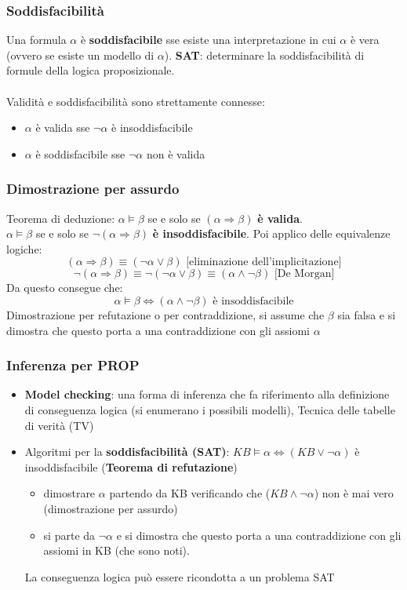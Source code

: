 \subsubsection{Soddisfacibilità}
Una formula $\alpha$ è \textbf{soddisfacibile} sse esiste una interpretazione in cui $\alpha$ è vera (ovvero se esiste un modello di $\alpha$).
\textbf{SAT}: determinare la soddisfacibilità di formule della logica proposizionale.\\\\
Validità e soddisfacibilità sono strettamente connesse:
\begin{itemize}
    \item $\alpha$ è valida sse $\lnot\alpha$ è insoddisfacibile
    \item $\alpha$ è soddisfacibile sse $\lnot\alpha$ non è valida
\end{itemize}

\subsubsection{Dimostrazione per assurdo}
Teorema di deduzione: $\alpha \models \beta$ se e solo se $(\alpha \Rightarrow \beta)$ \textbf{è valida}.\\
$\alpha \models \beta$ se e solo se $\lnot(\alpha \Rightarrow \beta)$ \textbf{è insoddisfacibile}.
Poi applico delle equivalenze logiche:
$$(\alpha \Rightarrow \beta) \equiv (\lnot\alpha \lor \beta) \text{ [eliminazione dell'implicitazione]}$$
$$\lnot(\alpha \Rightarrow \beta) \equiv \lnot (\lnot \alpha \lor \beta) \equiv (\alpha \land \lnot \beta) \text{ [De Morgan]}$$
Da questo consegue che:
$$\alpha \models \beta \Leftrightarrow (\alpha \land \lnot \beta) \text{ è insoddisfacibile}$$
Dimostrazione per refutazione o per contraddizione, si assume che $\beta$ sia falsa e si dimostra che questo porta a una contraddizione
con gli assiomi $\alpha$

\subsubsection{Inferenza per PROP}
\begin{itemize}
    \item \textbf{Model checking}: una forma di inferenza che fa riferimento alla definizione di
    conseguenza logica (si enumerano i possibili modelli), Tecnica delle tabelle di verità (TV)
    \item Algoritmi per la \textbf{soddisfacibilità (SAT)}: $KB \models \alpha \Leftrightarrow (KB \lor \lnot \alpha)$ è insoddisfacibile (\textbf{Teorema di refutazione})
    \begin{itemize}
        \item dimostrare $\alpha$ partendo da KB verificando che ($KB \land \lnot \alpha$) non è mai vero (dimostrazione per assurdo)
        \item si parte da $\lnot \alpha$ e si dimostra che questo porta a una contraddizione con gli assiomi in KB (che sono noti).
    \end{itemize}  
    La conseguenza logica può essere ricondotta a un problema SAT
\end{itemize}

